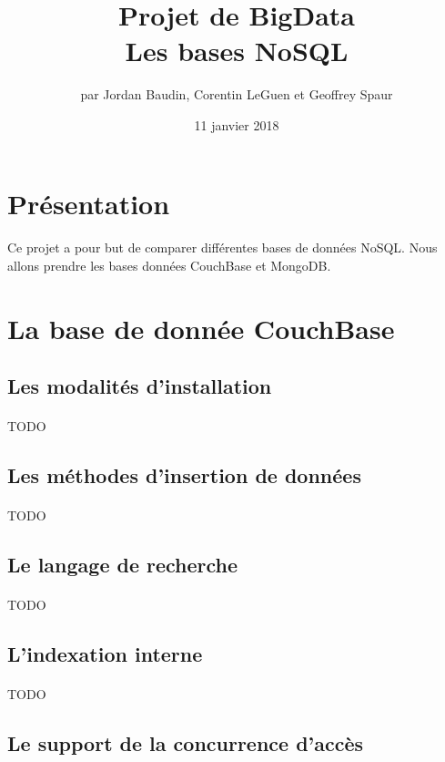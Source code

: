 \documentclass{article}
\title{Projet de BigData \\ Les bases NoSQL}
\author{par Jordan Baudin, Corentin LeGuen et Geoffrey Spaur}
\date{11 janvier 2018}
\begin{document}
\maketitle
\newpage
\tableofcontents{}
\newpage
\section{Présentation}
  \paragraph{}
  Ce projet a pour but de comparer différentes bases de données NoSQL.
  Nous allons prendre les bases données CouchBase et MongoDB.
  
 \newpage
\section{La base de donnée CouchBase}
\subsection{Les modalités d’installation}
  \paragraph{} TODO
\subsection{Les méthodes d’insertion de données}
  \paragraph{} TODO
\subsection{Le langage de recherche}
  \paragraph{} TODO
\subsection{L’indexation interne}
  \paragraph{} TODO
\subsection{Le support de la concurrence d’accès}
\end{document}
